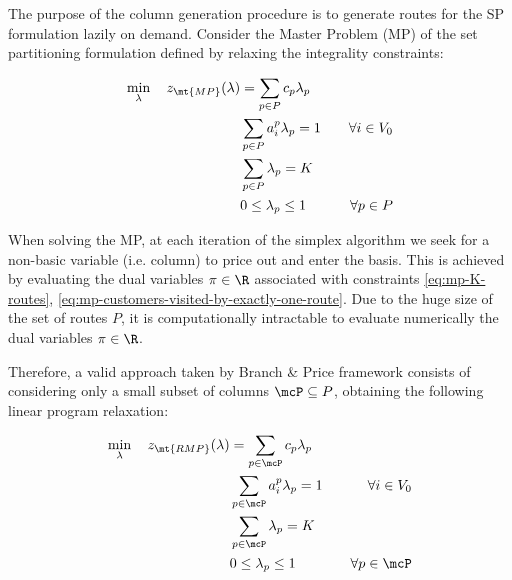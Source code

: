 The purpose of the column generation procedure is to generate routes for the SP formulation lazily on demand.
Consider the Master Problem (MP) of the set partitioning formulation defined by relaxing the integrality constraints:

\begin{align}
	\min_{\lambda} \quad z_\mt{MP}(\lambda) & = \sum_{p \in P}  c_p \lambda_p \label{eq:mp-obj-func}                                                                                                                             \\
	                                        & \sum_{p \in P}  a_{i}^p \lambda_p = 1                  & \quad \forall i \in V_0                                              \label{eq:mp-customers-visited-by-exactly-one-route} \\
	                                        & \sum_{p \in P} \lambda_{p} = K\label{eq:mp-K-routes}                                                                                                                               \\
	                                        & 0 \le \lambda_p \le 1                                  & \quad \forall p \in P \label{eq:mp-lambda-mip-var-bounds}
\end{align}


When solving the MP, at each iteration of the simplex algorithm we seek for a non-basic variable (i.e. column) to price out and enter the basis.
This is achieved by evaluating the dual variables $\pi \in \R$ associated with constraints \eqref{eq:mp-K-routes}, \eqref{eq:mp-customers-visited-by-exactly-one-route}.
Due to the huge size of the set of routes $P$, it is computationally intractable to evaluate numerically the dual variables $\pi \in \R$.

\medskip

Therefore, a valid approach taken by Branch \& Price framework consists of considering only a small subset of columns $\mcP \subseteq P$, obtaining the following linear program relaxation:

\begin{align}
	\min_{\lambda} \quad z_\mt{RMP}(\lambda) & = \sum_{p \in \mcP}  c_p \lambda_p \label{eq:rmp-obj-func}                                                                                                                              \\
	                                         & \sum_{p \in \mcP}  a_{i}^p \lambda_p = 1                   & \quad \forall i \in V_0                                              \label{eq:rmp-customers-visited-by-exactly-one-route} \\
	                                         & \sum_{p \in \mcP} \lambda_{p} = K\label{eq:rmp-K-routes}                                                                                                                                \\
	                                         & 0 \le \lambda_p \le 1                                        & \quad \forall p \in \mcP \label{eq:rmp-lambda-mip-var-bounds}
\end{align}

